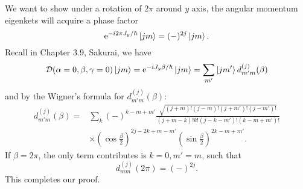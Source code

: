 \documentclass[10pt]{article}
\begin{document}
	We want to show under a rotation of $2\pi$ around $y$ axis, the angular momentum eigenkets will acquire a phase factor
	\begin{equation}
		{\mathrm{e}}^{-i 2\pi J_y / \hbar}\ket{jm} = (-)^{2j}\ket{jm}.
	\end{equation}
	Recall in Chapter 3.9, Sakurai, we have
	\begin{equation}
		\mathcal{D}(\alpha = 0, \beta, \gamma = 0) \ket{jm} = {\mathrm{e}}^{-i J_y \beta / \hbar}\ket{jm} = \sum_{m'} \ket{jm'} d^{(j)}_{m'm}(\beta)
	\end{equation}
	and by the Wigner's formula for $d^{(j)}_{m'm}(\beta)$:
	\begin{align*}
		d^{(j)}_{m'm}(\beta) =& \sum_{k}(-)^{k-m+m'} \frac{\sqrt{(j+m)!(j-m)!(j+m')!(j-m')!}}{(j+m-k)!k!(j-k-m')!(k-m+m')!} \\
		& \times (\cos{\frac{\beta}{2}})^{2j-2k+m-m'} (\sin{\frac{\beta}{2}})^{2k-m+m'}.
	\end{align*}
	If $\beta = 2\pi$, the only term contributes is $k=0, m'=m$, such that
	\begin{equation}
		d^{(j)}_{mm}(2 \pi) = (-)^{2j}.
	\end{equation}
	This completes our proof.
\end{document}
